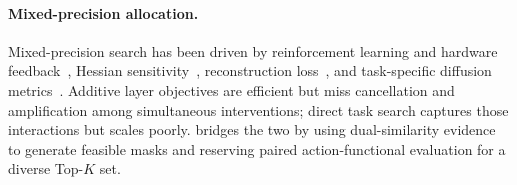 \paragraph{Mixed-precision allocation.}
Mixed-precision search has been driven by reinforcement learning and hardware feedback~\cite{wang2019haq}, Hessian sensitivity~\cite{wang2019hawq,dong2020hawqv2}, reconstruction loss~\cite{hubara2021accurate,li2021brecq}, and task-specific diffusion metrics~\cite{zhao2024mixdq,chen2024qdit}. Additive layer objectives are efficient but miss cancellation and amplification among simultaneous interventions; direct task search captures those interactions but scales poorly. \method bridges the two by using dual-similarity evidence to generate feasible masks and reserving paired action-functional evaluation for a diverse Top-$K$ set.

